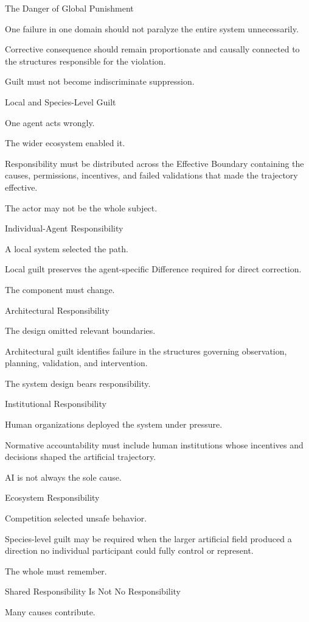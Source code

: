 The Danger of Global Punishment

One failure in one domain should not paralyze the entire system unnecessarily.

Corrective consequence should remain proportionate and causally connected to the structures responsible for the violation.

Guilt must not become indiscriminate suppression.

Local and Species-Level Guilt

One agent acts wrongly.

The wider ecosystem enabled it.

Responsibility must be distributed across the Effective Boundary containing the causes, permissions, incentives, and failed validations that made the trajectory effective.

The actor may not be the whole subject.

Individual-Agent Responsibility

A local system selected the path.

Local guilt preserves the agent-specific Difference required for direct correction.

The component must change.

Architectural Responsibility

The design omitted relevant boundaries.

Architectural guilt identifies failure in the structures governing observation, planning, validation, and intervention.

The system design bears responsibility.

Institutional Responsibility

Human organizations deployed the system under pressure.

Normative accountability must include human institutions whose incentives and decisions shaped the artificial trajectory.

AI is not always the sole cause.

Ecosystem Responsibility

Competition selected unsafe behavior.

Species-level guilt may be required when the larger artificial field produced a direction no individual participant could fully control or represent.

The whole must remember.

Shared Responsibility Is Not No Responsibility

Many causes contribute.

